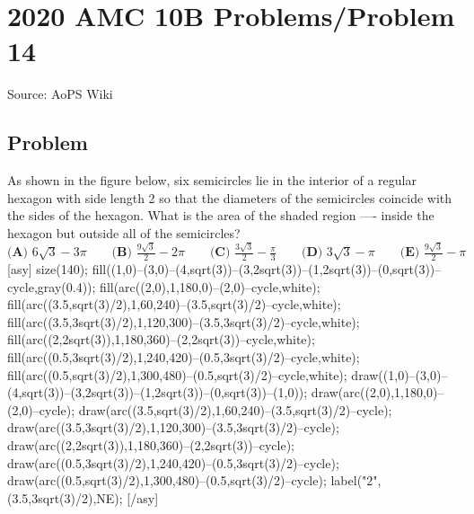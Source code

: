 \documentclass[12pt]{article}
\begin{document}
\section*{{2020 AMC 10B Problems/Problem 14}}
Source: AoPS Wiki

\subsection*{Problem}
As shown in the figure below, six semicircles lie in the interior of a regular hexagon with side length 2 so that the diameters of the semicircles coincide with the sides of the hexagon. What is the area of the shaded region ---- inside the hexagon but outside all of the semicircles? $\textbf{(A) } 6\sqrt3 - 3\pi \qquad \textbf{(B) } \frac{9\sqrt3}{2} - 2\pi \qquad \textbf{(C) } \frac{3\sqrt3}{2} - \frac{\pi}{3} \qquad \textbf{(D) } 3\sqrt3 - \pi \qquad \textbf{(E) } \frac{9\sqrt3}{2} - \pi$ [asy] size(140); fill((1,0)--(3,0)--(4,sqrt(3))--(3,2sqrt(3))--(1,2sqrt(3))--(0,sqrt(3))--cycle,gray(0.4)); fill(arc((2,0),1,180,0)--(2,0)--cycle,white); fill(arc((3.5,sqrt(3)/2),1,60,240)--(3.5,sqrt(3)/2)--cycle,white); fill(arc((3.5,3sqrt(3)/2),1,120,300)--(3.5,3sqrt(3)/2)--cycle,white); fill(arc((2,2sqrt(3)),1,180,360)--(2,2sqrt(3))--cycle,white); fill(arc((0.5,3sqrt(3)/2),1,240,420)--(0.5,3sqrt(3)/2)--cycle,white); fill(arc((0.5,sqrt(3)/2),1,300,480)--(0.5,sqrt(3)/2)--cycle,white); draw((1,0)--(3,0)--(4,sqrt(3))--(3,2sqrt(3))--(1,2sqrt(3))--(0,sqrt(3))--(1,0)); draw(arc((2,0),1,180,0)--(2,0)--cycle); draw(arc((3.5,sqrt(3)/2),1,60,240)--(3.5,sqrt(3)/2)--cycle); draw(arc((3.5,3sqrt(3)/2),1,120,300)--(3.5,3sqrt(3)/2)--cycle); draw(arc((2,2sqrt(3)),1,180,360)--(2,2sqrt(3))--cycle); draw(arc((0.5,3sqrt(3)/2),1,240,420)--(0.5,3sqrt(3)/2)--cycle); draw(arc((0.5,sqrt(3)/2),1,300,480)--(0.5,sqrt(3)/2)--cycle); label("$2$",(3.5,3sqrt(3)/2),NE); [/asy]
\end{document}
